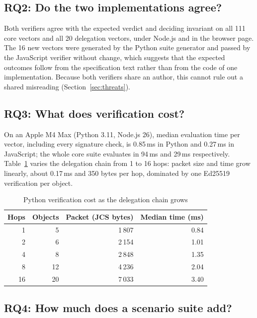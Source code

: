 \documentclass[conference]{IEEEtran}
\begin{document}
\subsection*{RQ2: Do the two implementations agree?}

Both verifiers agree with the expected verdict and deciding invariant on all 111 core vectors and all 20 delegation vectors, under Node.js and in the browser page. The 16 new vectors were generated by the Python suite generator and passed by the JavaScript verifier without change, which suggests that the expected outcomes follow from the specification text rather than from the code of one implementation. Because both verifiers share an author, this cannot rule out a shared misreading (Section~\ref{sec:threats}).

\subsection*{RQ3: What does verification cost?}

On an Apple M4 Max (Python 3.11, Node.js 26), median evaluation time per vector, including every signature check, is 0.85\,ms in Python and 0.27\,ms in JavaScript; the whole core suite evaluates in 94\,ms and 29\,ms respectively. Table~\ref{tab:cost} varies the delegation chain from 1 to 16 hops: packet size and time grow linearly, about 0.17\,ms and 350 bytes per hop, dominated by one Ed25519 verification per object.

\begin{table}[t]
\caption{Python verification cost as the delegation chain grows}\label{tab:cost}
\centering\small
\begin{tabular}{@{}rrrr@{}}
\toprule
Hops & Objects & Packet (JCS bytes) & Median time (ms) \\
\midrule
1 & 5 & 1\,807 & 0.84 \\
2 & 6 & 2\,154 & 1.01 \\
4 & 8 & 2\,848 & 1.35 \\
8 & 12 & 4\,236 & 2.04 \\
16 & 20 & 7\,033 & 3.40 \\
\bottomrule
\end{tabular}
\end{table}

\subsection*{RQ4: How much does a scenario suite add?}
\end{document}
